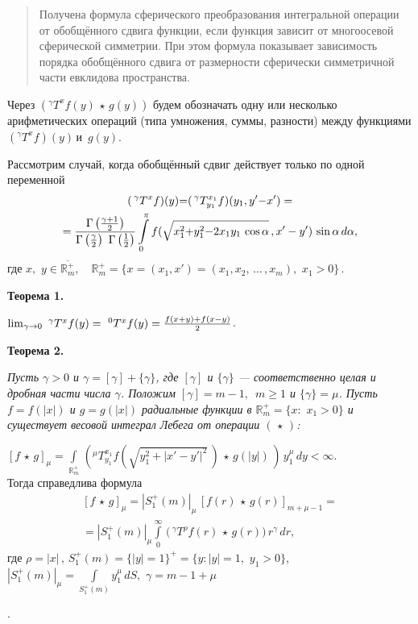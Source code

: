 






\vzmscaption


\begin{quote}
 {\small
Получена формула сферического преобразования интегральной операции от обобщённого сдвига функции, если функция зависит от многоосевой сферической симметрии. При этом формула показывает зависимость порядка обобщённого сдвига от размерности сферически симметричной части евклидова пространства.}
 \end{quote}

	Через
	$
	\left(^\gamma T^xf(y)\,\star\,g(y)\right)
	$
	будем обозначать одну или несколько арифметических операций (типа умножения, суммы, разности) между функциями $\left(^\gamma T^xf\right)(y)$\,и \,$g(y)$.

	 Рассмотрим случай, когда обобщённый сдвиг действует только по одной переменной
\begin{multline*}
	(\,^\gamma T^{x}f)(y){=}(\,^\gamma T_{y_1}^{x_1}f)(y_1,y'{-}x')=
	\\=
	\frac{\Gamma\left(\gamma+1\over2\right)}{\Gamma\left(\frac{\gamma}{2}\right)\,\,\Gamma\left(\frac{1}{2}\right)}\int\limits_0^\pi
	f(\sqrt{x_1^2{+}y^2_1{-}2x_1y_1\,\cos\alpha}\,,x'-y')\,\sin\alpha
	\,d\alpha,
\end{multline*}
где $x,\,\,y\in\overline{\mathbb{R}^+_m},\quad	\mathbb{R}^+_m{=}\{x{=}(x_1,x'){=}(x_1,x_2,\,\ldots\,,x_m),\,\,x_1>0\}\,.$

	{\bf Теорема 1.}  {\it $\lim_{\gamma\to0}\,\,^\gamma T^x f(y)=\,\,^0T^x f(y)={f(x+y)+f(x-y)\over2}$.

{\bf Теорема 2.}  {\it    Пусть $\gamma{>}0$ и $\gamma=[\gamma]+\{\gamma\}$, где $[\gamma]$ и $\{\gamma\}$ --- соответственно целая и дробная части числа $\gamma$.
Положим $[\gamma]=m-1, \,\,\,m\geqslant1$ и $\{\gamma\}=\mu$. Пусть $f=f(|x|)$ и
$g=g(|x|)$ радиальные функции в $\mathbb{R}^+_m=\{x:\,\,x_1>0\}$ и существует весовой интеграл Лебега от операции $(\,\star\,)$:

$
[f\,\star\,g]_\mu=\int\limits_{\mathbb{R}^+_m}\,\left(^\mu T^{x_1}_{y_1}f(\sqrt{y_1^2+
|x'-y'|^2}\,)\,\star\,g(|y|)\,\right)\,y_1^\mu\,dy<\infty.
$ \\
Тогда справедлива формула
\begin{multline}\label{eq2}
	[f\,\star\,g]_\mu=|S_1^+(m)|_\mu\, \left[f(r)\,\star\,g(r)\right]_{m+\mu-1} =
	\\=
	|S^+_1(m)|_\mu\int\limits_0^\infty \,\biggl(\,^\gamma T^\rho f(r)\,\star\,g(r)
	\biggl)\,r^\gamma\,dr,
\end{multline}
где  $\rho=|x|\,, \,S^+_1(m){=}\{|y|{=}1\}^+{=}\{y:|y|{=}1,\,\,y_1>0\}$,
$
|S_1^+(m)|_\mu{=}\int\limits_{S_1^+(m)} y_1^\mu\,dS,$  $\gamma{=}m{-}1{+}\mu$}}.

